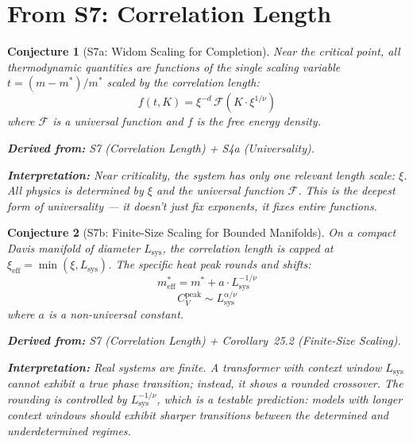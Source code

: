 \documentclass[11pt,letterpaper]{article}
\newtheorem{conjecture}{Conjecture}[section]
\begin{document}
\newpage
\section{From S7: Correlation Length}

\begin{conjecture}[S7a: Widom Scaling for 
Completion]\label{conj:widom}
Near the critical point, all thermodynamic quantities are functions of the 
single scaling variable $t = (m - m^*) / m^*$ scaled by the correlation 
length:
\begin{equation}
    f(t, K) = \xi^{-d} \, \mathcal{F}(K \cdot \xi^{1/\nu})
\end{equation}
where $\mathcal{F}$ is a universal function and $f$ is the free energy 
density.

\textbf{Derived from:} S7 (Correlation Length) + S4a (Universality).

\textbf{Interpretation:} Near criticality, the system has only one 
relevant length scale: $\xi$. All physics is determined by $\xi$ and the 
universal function $\mathcal{F}$. This is the deepest form of universality 
--- it doesn't just fix exponents, it fixes entire functions.
\end{conjecture}

\begin{conjecture}[S7b: Finite-Size Scaling for Bounded 
Manifolds]\label{conj:finite_size}
On a compact Davis manifold of diameter $L_{\mathrm{sys}}$, the 
correlation length is capped at $\xi_{\mathrm{eff}} = \min(\xi, 
L_{\mathrm{sys}})$. The specific heat peak rounds and shifts:
\begin{equation}
    m^*_{\mathrm{eff}} = m^* + a \cdot L_{\mathrm{sys}}^{-1/\nu}
\end{equation}
\begin{equation}
    C_V^{\mathrm{peak}} \sim L_{\mathrm{sys}}^{\alpha / \nu}
\end{equation}
where $a$ is a non-universal constant.

\textbf{Derived from:} S7 (Correlation Length) + Corollary~25.2 
(Finite-Size Scaling).

\textbf{Interpretation:} Real systems are finite. A transformer with 
context window $L_{\mathrm{sys}}$ cannot exhibit a true phase transition; 
instead, it shows a rounded crossover. The rounding is controlled by 
$L_{\mathrm{sys}}^{-1/\nu}$, which is a testable prediction: models with 
longer context windows should exhibit sharper transitions between the 
determined and underdetermined regimes.
\end{conjecture}
\end{document}
